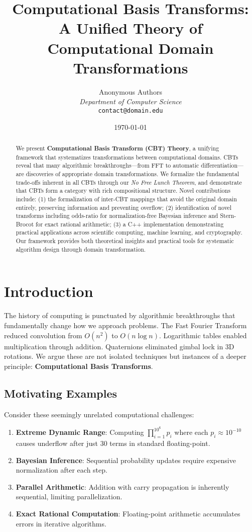 \documentclass[12pt,a4paper]{article}
\title{Computational Basis Transforms:\\
A Unified Theory of Computational Domain Transformations}
\author{
    Anonymous Authors\\
    \textit{Department of Computer Science}\\
    \texttt{contact@domain.edu}
}
\date{\today}
\theoremstyle{definition}
\begin{document}
\maketitle

\begin{abstract}
We present \textbf{Computational Basis Transform (CBT) Theory}, a unifying framework that systematizes transformations between computational domains. CBTs reveal that many algorithmic breakthroughs—from FFT to automatic differentiation—are discoveries of appropriate domain transformations. We formalize the fundamental trade-offs inherent in all CBTs through our \textit{No Free Lunch Theorem}, and demonstrate that CBTs form a category with rich compositional structure. Novel contributions include: (1) the formalization of inter-CBT mappings that avoid the original domain entirely, preserving information and preventing overflow; (2) identification of novel transforms including odds-ratio for normalization-free Bayesian inference and Stern-Brocot for exact rational arithmetic; (3) a C++ implementation demonstrating practical applications across scientific computing, machine learning, and cryptography. Our framework provides both theoretical insights and practical tools for systematic algorithm design through domain transformation.
\end{abstract}

\section{Introduction}

The history of computing is punctuated by algorithmic breakthroughs that fundamentally change how we approach problems. The Fast Fourier Transform reduced convolution from $O(n^2)$ to $O(n \log n)$. Logarithmic tables enabled multiplication through addition. Quaternions eliminated gimbal lock in 3D rotations. We argue these are not isolated techniques but instances of a deeper principle: \textbf{Computational Basis Transforms}.

\subsection{Motivating Examples}

Consider these seemingly unrelated computational challenges:

\begin{enumerate}
\item \textbf{Extreme Dynamic Range}: Computing $\prod_{i=1}^{10^6} p_i$ where each $p_i \approx 10^{-10}$ causes underflow after just 30 terms in standard floating-point.

\item \textbf{Bayesian Inference}: Sequential probability updates require expensive normalization after each step.

\item \textbf{Parallel Arithmetic}: Addition with carry propagation is inherently sequential, limiting parallelization.

\item \textbf{Exact Rational Computation}: Floating-point arithmetic accumulates errors in iterative algorithms.
\end{enumerate}
\end{document}
